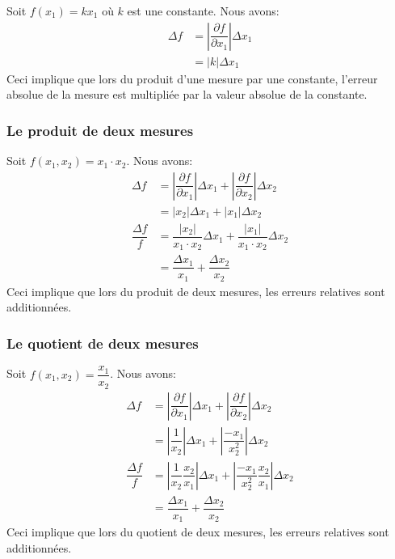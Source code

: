 \documentclass[]{book}
\theoremstyle{definition}
\theoremstyle{definition}
\theoremstyle{definition}
\theoremstyle{remark}
\begin{document}
Soit \(f(x_1)=kx_1\) où \(k\) est une constante. Nous avons:
\begin{align*}
\Delta f &= \left| \dfrac{\partial f}{\partial x_1} \right| \Delta x_1 \\
&= |k| \Delta x_1
\end{align*} Ceci implique que lors du produit d'une mesure par une
constante, l'erreur absolue de la mesure est multipliée par la valeur
absolue de la constante.

\hypertarget{le-produit-de-deux-mesures}{%
\subsubsection{Le produit de deux
mesures}\label{le-produit-de-deux-mesures}}

Soit \(f(x_1,x_2)=x_1 \cdot x_2\). Nous avons: \begin{align*}
\Delta f &= \left| \dfrac{\partial f}{\partial x_1} \right| \Delta x_1
+ \left| \dfrac{\partial f}{\partial x_2} \right| \Delta x_2 \\
&= |x_2| \Delta x_1 + |x_1| \Delta x_2 \\
\dfrac{\Delta f}{f} &= \dfrac{|x_2|}{x_1\cdot x_2}\Delta x_1 + \dfrac{|x_1|}{x_1\cdot x_2}\Delta x_2 \\
&= \dfrac{\Delta x_1}{x_1} + \dfrac{\Delta x_2}{x_2}
\end{align*} Ceci implique que lors du produit de deux mesures, les
erreurs relatives sont additionnées.

\hypertarget{le-quotient-de-deux-mesures}{%
\subsubsection{Le quotient de deux
mesures}\label{le-quotient-de-deux-mesures}}

Soit \(f(x_1,x_2)=\dfrac{x_1}{x_2}\). Nous avons: \begin{align*}
\Delta f &= \left| \dfrac{\partial f}{\partial x_1} \right| \Delta x_1
+ \left| \dfrac{\partial f}{\partial x_2} \right| \Delta x_2 \\
&= \left| \dfrac{1}{x_2} \right| \Delta x_1 + \left| \dfrac{-x_1}{x_2^2} \right| \Delta x_2 \\
\dfrac{\Delta f}{f} &= \left| \dfrac{1}{x_2}\dfrac{x_2}{x_1} \right| \Delta x_1 + \left| \dfrac{-x_1}{x_2^2}\dfrac{x_2}{x_1} \right| \Delta x_2 \\
&= \dfrac{\Delta x_1}{x_1} + \dfrac{\Delta x_2}{x_2}
\end{align*} Ceci implique que lors du quotient de deux mesures, les
erreurs relatives sont additionnées.
\end{document}
